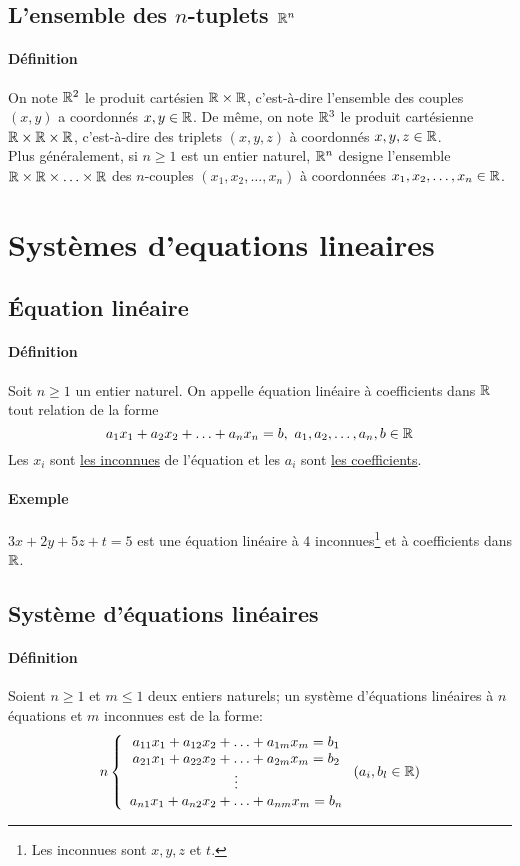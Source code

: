 %
\subsection{L'ensemble des $n$-tuplets $\mathbb{R}^n$}
%
\paragraph{Définition} On note $\mathbb{R}^2$ le produit cartésien $\mathbb{R} \times \mathbb{R}$, c'est-à-dire l'ensemble des couples $(x, y)$ a coordonnés $x, y \in \mathbb{R}$. De même, on note $\mathbb{R}^3$ le produit cartésienne $\mathbb{R} \times \mathbb{R} \times \mathbb{R}$, c'est-à-dire des triplets $(x, y, z)$ à coordonnés $x, y, z \in \mathbb{R}$. \\
Plus généralement, si $n \geq 1$ est un entier naturel, $\mathbb{R}^n$ designe l'ensemble $\mathbb{R} \times \mathbb{R} \times \ldots \times \mathbb{R}$ des $n$-couples $(x_1, x_2, \ldots, x_n)$ à coordonnées $x_1, x_2, \ldots, x_n \in \mathbb{R}$.
        
%
%
\section{Systèmes d'equations lineaires}
%
%

%
\subsection{Équation linéaire}
%
\paragraph{Définition} Soit $n \geq 1$ un entier naturel. On appelle équation linéaire à coefficients dans $\mathbb{R}$ tout relation de la forme 
$$a_1 x_1 + a_2 x_2 + \ldots + a_n x_n = b, ~ a_1, a_2, \ldots, a_n, b \in \mathbb{R}$$
Les $x_i$ sont \underline{les inconnues} de l'équation et les $a_i$ sont \underline{les coefficients}.

\paragraph{Exemple} $3 x + 2 y + 5 z + t = 5$ est une équation linéaire à $4$ inconnues\footnote{Les inconnues sont $x, y, z$ et $t$.} et à coefficients dans $\mathbb{R}$.

%
\subsection{Système d'équations linéaires}
%
\paragraph{Définition} Soient $n \geq 1$ et $m \leq 1$ deux entiers naturels; un système d'équations linéaires à $n$ équations et $m$ inconnues est de la forme:
$$n \left\{ \begin{array}{c}
  a_{11}x_{1} + a_{12}x_{2} + \ldots + a_{1m}x_{m} = b_{1} \\
  a_{21}x_{1} + a_{22}x_{2} + \ldots + a_{2m}x_{m} = b_{2} \\
  \vdots \\
  a_{n1}x_{1} + a_{n2}x_{2} + \ldots + a_{nm}x_{m} = b_{n}
\end{array} \right. (a_i, b_l \in \mathbb{R})$$

